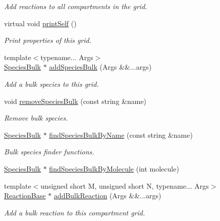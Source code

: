 \begin{DoxyCompactItemize}
\begin{DoxyCompactList}\small\item\em Add reactions to all compartments in the grid. \end{DoxyCompactList}\item 
virtual void \hyperlink{classCompartmentGrid_a1c94761f08339f43d77cc6b90504dc49}{print\+Self} ()
\begin{DoxyCompactList}\small\item\em Print properties of this grid. \end{DoxyCompactList}\item 
{\footnotesize template$<$typename... Args$>$ }\\\hyperlink{classSpeciesBulk}{Species\+Bulk} $\ast$ \hyperlink{classCompartmentGrid_a7c7a9604dfc4d45b0cc928ad36e6856b}{add\+Species\+Bulk} (Args \&\&...args)
\begin{DoxyCompactList}\small\item\em Add a bulk species to this grid. \end{DoxyCompactList}\item 
void \hyperlink{classCompartmentGrid_a1563cfc41b6a11909d583848140d3a50}{remove\+Species\+Bulk} (const string \&name)
\begin{DoxyCompactList}\small\item\em Remove bulk species. \end{DoxyCompactList}\item 
\hyperlink{classSpeciesBulk}{Species\+Bulk} $\ast$ \hyperlink{classCompartmentGrid_a33af231bf3d92bf15f43e62d76332989}{find\+Species\+Bulk\+By\+Name} (const string \&name)
\begin{DoxyCompactList}\small\item\em Bulk species finder functions. \end{DoxyCompactList}\item 
\hyperlink{classSpeciesBulk}{Species\+Bulk} $\ast$ \hyperlink{classCompartmentGrid_aa4cf54c38fc995c284c3f55cb274810f}{find\+Species\+Bulk\+By\+Molecule} (int molecule)
\item 
{\footnotesize template$<$unsigned short M, unsigned short N, typename... Args$>$ }\\\hyperlink{classReactionBase}{Reaction\+Base} $\ast$ \hyperlink{classCompartmentGrid_ac543574faefc1bb4cfe46a3d175ef194}{add\+Bulk\+Reaction} (Args \&\&...args)
\begin{DoxyCompactList}\small\item\em Add a bulk reaction to this compartment grid. \end{DoxyCompactList}\item 

\end{DoxyCompactItemize}

